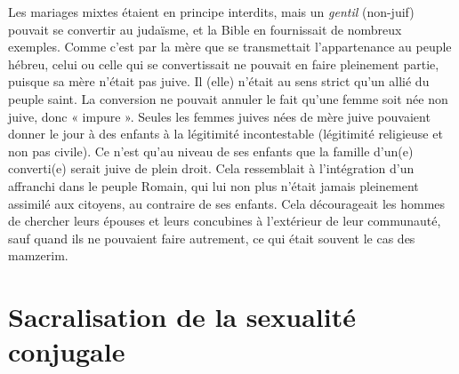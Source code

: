 Les mariages mixtes étaient en principe interdits, mais un \emph{gentil} (non-juif) pouvait se convertir au judaïsme, et la Bible en fournissait de nombreux exemples. Comme c'est par la mère que se transmettait l'appartenance au peuple hébreu, celui ou celle qui se convertissait ne pouvait en faire pleinement partie, puisque sa mère n'était pas juive. Il (elle) n'était au sens strict qu'un allié du peuple saint. La conversion ne pouvait annuler le fait qu'une femme soit née non juive, donc « impure ». Seules les femmes juives nées de mère juive pouvaient donner le jour à des enfants à la légitimité incontestable (légitimité religieuse et non pas civile). Ce n'est qu'au niveau de ses enfants que la famille d'un(e) converti(e) serait juive de plein droit. Cela ressemblait à l'intégration d'un affranchi dans le peuple Romain, qui lui non plus n'était jamais pleinement assimilé aux citoyens, au contraire de ses enfants. Cela décourageait les hommes de chercher leurs épouses et leurs concubines à l'extérieur de leur communauté, sauf quand ils ne pouvaient faire autrement, ce qui était souvent le cas des mamzerim.



\section{Sacralisation de la sexualité conjugale}

